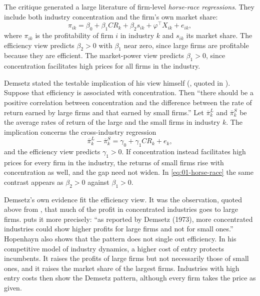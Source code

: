 The critique generated a large literature of firm-level \emph{horse-race regressions}. They include both
industry concentration and the firm's own market share:
\begin{equation}\label{eq:01-horse-race}
\pi_{ik} = \beta_0 + \beta_1 \mathit{CR}_k + \beta_2 s_{ik} + \varphi^\top X_{ik} + e_{ik},
\end{equation}
where $\pi_{ik}$ is the profitability of firm $i$ in industry $k$ and $s_{ik}$ its market share. The
efficiency view predicts $\beta_2 > 0$ with $\beta_1$ near zero, since large firms are profitable
because they are efficient. The market-power view predicts $\beta_1 > 0$, since concentration
facilitates high prices for all firms in the industry.

Demsetz stated the testable implication of his view himself (\citealp[p.~5]{Demsetz1973}, quoted in
\citealp[p.~46, n.~5]{LevensteinSuslow2006}). Suppose that efficiency is associated with concentration. Then
``there should be a positive correlation between concentration and the difference between the rate of return
earned by large firms and that earned by small firms.'' Let $\bar\pi^L_k$ and $\bar\pi^S_k$ be the average rates of return
of the large and the small firms in industry $k$. The implication concerns the cross-industry regression
\begin{equation}\label{eq:01-demsetz-test}
\bar\pi^L_k - \bar\pi^S_k = \gamma_0 + \gamma_1 \mathit{CR}_k + e_k ,
\end{equation}
and the efficiency view predicts $\gamma_1 > 0$. If concentration instead facilitates high prices for every firm
in the industry, the returns of small firms rise with concentration as well, and the gap need not widen. In
\eqref{eq:01-horse-race} the same contrast appears as $\beta_2 > 0$ against $\beta_1 > 0$.

Demsetz's own evidence fit the efficiency view. It was the observation, quoted above from
\citet[p.~1013, n.~2]{Bresnahan1989}, that much of the profit in concentrated industries goes to large firms.
\citet[p.~1142]{Hopenhayn1992} puts it more precisely: ``as reported by Demsetz (1973), more concentrated
industries could show higher profits for large firms and not for small ones.'' Hopenhayn also shows that the
pattern does not single out efficiency. In his competitive model of industry dynamics, a higher cost of entry
protects incumbents. It raises the profits of large firms but not necessarily those of small ones, and it raises
the market share of the largest firms. Industries with high entry costs then show the Demsetz pattern, although
every firm takes the price as given.

